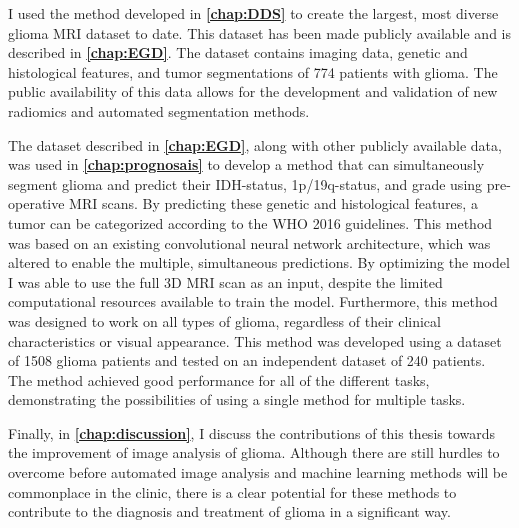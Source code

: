 I used the method developed in \textbf{\cref{chap:DDS}} to create the largest, most diverse glioma \gls{MRI} dataset to date.
This dataset has been made publicly available and is described in \textbf{\cref{chap:EGD}}.
The dataset contains imaging data, genetic and histological features, and \gls{tumor} segmentations of 774 patients with glioma.
The public availability of this data allows for the development and validation of new radiomics and automated segmentation methods.

The dataset described in \textbf{\cref{chap:EGD}}, along with other publicly available data, was used in \textbf{\cref{chap:prognosais}} to develop a method that can simultaneously segment glioma and predict their \gls{IDH}-status, 1p/19q-status, and grade using pre-operative \gls{MRI} scans.
By predicting these genetic and histological features, a \gls{tumor} can be categorized according to the \gls{WHO} 2016 guidelines.
This method was based on an existing convolutional neural network architecture, which was altered to enable the multiple, simultaneous predictions.
By optimizing the model I was able to use the full 3D \gls{MRI} scan as an input, despite the limited computational resources available to train the model.
Furthermore, this method was designed to work on all types of glioma, regardless of their clinical characteristics or visual appearance.
This method was developed using a dataset of \num{1508} glioma patients and tested on an independent dataset of \num{240} patients.
The method achieved good performance for all of the different tasks, demonstrating the possibilities of using a single method for multiple tasks.

Finally, in \textbf{\cref{chap:discussion}}, I discuss the contributions of this thesis towards the improvement of image analysis of glioma.
Although there are still hurdles to overcome before automated image analysis and machine learning methods will be commonplace in the clinic, there is a clear potential for these methods to contribute to the diagnosis and treatment of glioma in a significant way.

